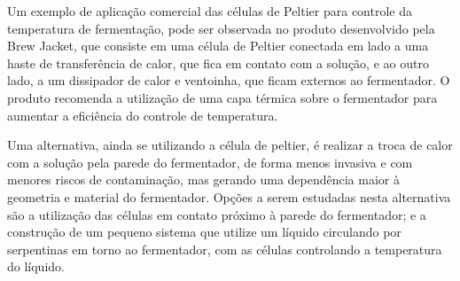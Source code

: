 Um exemplo de aplicação comercial das células de Peltier para controle da temperatura de fermentação, pode ser observada no produto desenvolvido pela Brew Jacket, que consiste em uma célula de Peltier conectada em lado a uma haste de transferência de calor, que fica em contato com a solução, e ao outro lado, a um dissipador de calor e ventoinha, que ficam externos ao fermentador. O produto recomenda a utilização de uma capa térmica sobre o fermentador para aumentar a eficiência do controle de temperatura.


Uma alternativa, ainda se utilizando a célula de peltier, é realizar a troca de calor com a solução pela parede do fermentador, de forma menos invasiva e com menores riscos de contaminação, mas gerando uma dependência maior à geometria e material do fermentador. Opções a serem estudadas nesta alternativa são a utilização das células em contato próximo à parede do fermentador; e a construção de um pequeno sistema que utilize um líquido circulando por serpentinas em torno ao fermentador, com as células  controlando a temperatura do líquido.

